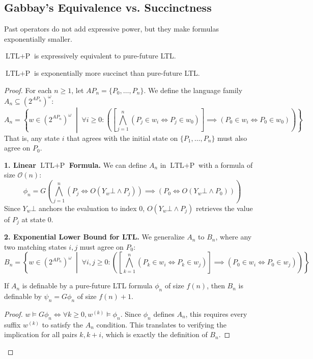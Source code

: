 \subsection{Gabbay's Equivalence vs. Succinctness}
Past operators do not add expressive power, but they make formulas exponentially smaller.
\begin{theorem}
$\text{LTL}+\text{P}$ is expressively equivalent to pure-future LTL.
\end{theorem}

\begin{theorem}
\label{thm:succinctness}
$\text{LTL}+\text{P}$ is exponentially more succinct than pure-future LTL.
\end{theorem}

\begin{proof}
For each $n \ge 1$, let $AP_n = \{P_0, \dots, P_n\}$. We define the language family $A_n \subseteq (2^{AP_n})^\omega$:
\[
  A_n = \left\{ w \in (2^{AP_n})^\omega \;\middle|\; \forall i \ge 0 : \left( \left[ \bigwedge_{j=1}^n \left( P_j \in w_i \iff P_j \in w_0 \right) \right] \implies \left( P_0 \in w_i \iff P_0 \in w_0 \right) \right) \right\}
\]
That is, any state $i$ that agrees with the initial state on $\{P_1, \dots, P_n\}$ must also agree on $P_0$.

\medskip\noindent
\textbf{1. Linear $\text{LTL}+\text{P}$ Formula.} We can define $A_n$ in $\text{LTL}+\text{P}$ with a formula of size $\mathcal{O}(n)$:
\[
  \phi_n = G \left( \bigwedge_{j=1}^n \left( P_j \iff O( Y_w \bot \land P_j ) \right) \implies \left( P_0 \iff O( Y_w \bot \land P_0 ) \right) \right)
\]
Since $Y_w \bot$ anchors the evaluation to index $0$, $O(Y_w \bot \land P_j)$ retrieves the value of $P_j$ at state 0.

\medskip\noindent
\textbf{2. Exponential Lower Bound for LTL.} We generalize $A_n$ to $B_n$, where any two matching states $i, j$ must agree on $P_0$:
\[
  B_n = \left\{ w \in (2^{AP_n})^\omega \;\middle|\; \forall i, j \ge 0 : \left( \left[ \bigwedge_{k=1}^n \left( P_k \in w_i \iff P_k \in w_j \right) \right] \implies \left( P_0 \in w_i \iff P_0 \in w_j \right) \right) \right\}
\]
\begin{lemma}
If $A_n$ is definable by a pure-future LTL formula $\phi_n$ of size $f(n)$, then $B_n$ is definable by $\psi_n = G \phi_n$ of size $f(n) + 1$.
\end{lemma}
\begin{proof}
$w \models G \phi_n \iff \forall k \ge 0, w^{(k)} \models \phi_n$. Since $\phi_n$ defines $A_n$, this requires every suffix $w^{(k)}$ to satisfy the $A_n$ condition. This translates to verifying the implication for all pairs $k, k+i$, which is exactly the definition of $B_n$.
\end{proof}


\end{proof}
